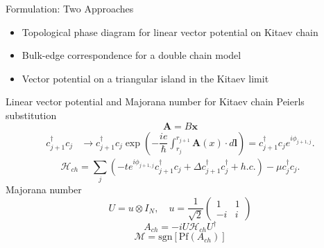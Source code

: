 \documentclass[xcolor=dvipsnames,10pt,aspectratio=169]{beamer}
\renewcommand{\vec}[1]{\mathbf{#1}}
\newcommand{\ham}{\mathcal{H}}
\newcommand{\cc}{c^{\dagger}}
\newcommand{\de}{\Delta}
\newcommand{\FO}{Formulation}
\begin{document}
  \begin{frame}{\FO: Two Approaches}
    \begin{itemize}
      \item Topological phase diagram for linear vector potential on Kitaev chain
      \item[] Bulk-edge correspondence for a double chain model
      \item Vector potential on a triangular island in the Kitaev limit
    \end{itemize}
  \end{frame}

  \begin{frame}{Linear vector potential and Majorana number for Kitaev chain}
    Peierls substitution
    \begin{equation}
      \vec{A} = B\vec{x}
    \end{equation}
    \begin{align}
      \cc_{j+1} c_j &\rightarrow \cc_{j+1} c_j \exp \left(-\dfrac{i e}{\hbar} \int_{r_j}^{r_{j+1}} \vec{A}(x) \cdot d\vec{l} \right) = \cc_{j+1} c_j e^{i \phi_{j+1,j}}.
    \end{align}
    \begin{equation} \label{eq: Peierls chain}
      \ham_{ch} = \sum_j (-t e^{i\phi_{j+1,j}} \cc_{j+1} c_j + \de \cc_{j+1}\cc_j + h.c.) - \mu \cc_j c_j.
    \end{equation}
    Majorana number
    \begin{equation}
      U = u \otimes I_N,\quad u = \dfrac{1}{\sqrt{2}} \left(
      \begin{matrix}
        1 & 1 \\
        -i & i
    \end{matrix} \right)
    \end{equation}
    \begin{equation}
      A_{ch} = -iU\ham_{ch}U^\dagger
    \end{equation}
    \begin{equation}
      \mathcal{M} = \text{sgn}[\text{Pf}(A_{ch})]
    \end{equation}
  \end{frame}
\end{document}

